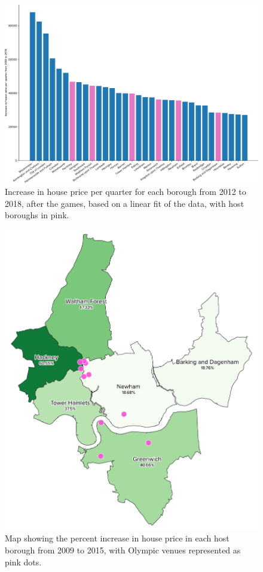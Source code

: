 \documentclass[12pt,twoside]{article}
\begin{document}
\begin{figure}[!htb]
\centering
\includegraphics[width=0.8\linewidth]{figures/house-price-trend-after-olympics.pdf}
\caption{Increase in house price per quarter for each borough from 2012 to 2018, after the games, based on a linear fit of the data, with host boroughs in pink.}
\label{fig:house-price-trend-after-olympics}
\end{figure}

\begin{figure}[!htb]
\centering
\includegraphics[width=0.6\linewidth]{figures/house-prices-percent-change-growth-boroughs.pdf}
\caption{Map showing the percent increase in house price in each host borough from 2009 to 2015, with Olympic venues represented as pink dots.}
\label{fig:house-prices-percent-change-growth-boroughs-map}
\end{figure}
\end{document}
